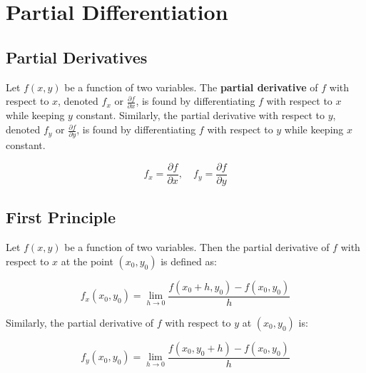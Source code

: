 \chapter{Partial Differentiation}
\label{chap:partial-differentiation}

\section{Partial Derivatives}

\begin{definition}
  \label{def:partial-derivative}
  Let \( f(x, y) \) be a function of two variables. The \textbf{partial derivative} of \( f \) with respect to \( x \), denoted \( f_x \) or \( \frac{\partial f}{\partial x} \), is found by differentiating \( f \) with respect to \( x \) while keeping \( y \) constant. Similarly, the partial derivative with respect to \( y \), denoted \( f_y \) or \( \frac{\partial f}{\partial y} \), is found by differentiating \( f \) with respect to \( y \) while keeping \( x \) constant.

  \[
    f_x = \frac{\partial f}{\partial x}, \quad
    f_y = \frac{\partial f}{\partial y}
  \]
\end{definition}

\section{First Principle}
\label{sec:first-principle-partial-derivative}

\begin{definition}
  \label{def:partial-derivative-first-principle}
  Let \( f(x, y) \) be a function of two variables. Then the partial derivative of \( f \) with respect to \( x \) at the point \( (x_0, y_0) \) is defined as:

  \[
    f_x(x_0, y_0) = \lim_{h \to 0} \frac{f(x_0 + h, y_0) - f(x_0, y_0)}{h}
  \]

  Similarly, the partial derivative of \( f \) with respect to \( y \) at \( (x_0, y_0) \) is:

  \[
    f_y(x_0, y_0) = \lim_{h \to 0} \frac{f(x_0, y_0 + h) - f(x_0, y_0)}{h}
  \]
\end{definition}

